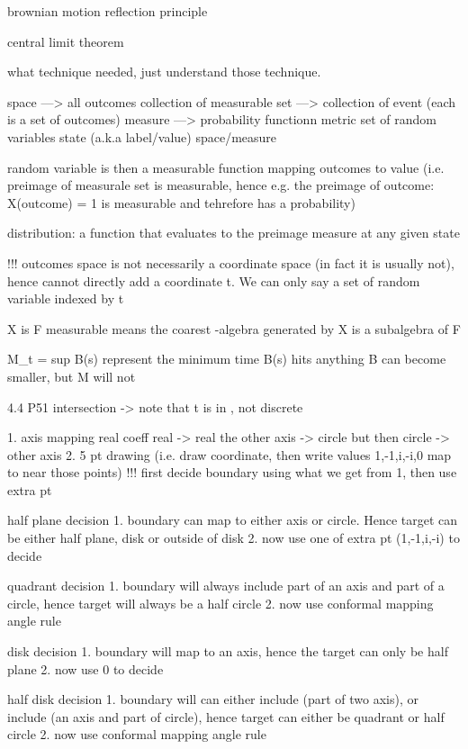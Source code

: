 brownian motion
reflection principle

central limit theorem

what technique needed, just understand those technique.

space  ---> all outcomes
collection of measurable set ---> collection of event (each is a set of outcomes)
measure ---> probability functionn
metric
set of random variables
state (a.k.a label/value) space/measure

random variable is then a measurable function mapping outcomes to value (i.e. preimage of measurale set is measurable, hence e.g. the preimage of {outcome: X(outcome) = 1} is measurable and tehrefore has a probability)

distribution: a function that evaluates to the preimage measure at any given state

!!! outcomes space is not necessarily a coordinate space (in fact it is usually not), hence cannot directly add a coordinate t. We can only say a set of random variable indexed by t


X is F measurable means the coarest \sigma-algebra generated by X is a subalgebra of F


M_t = sup B(s) represent the minimum time B(s) hits anything
B can become smaller, but M will not

4.4 P51 intersection -> note that t is in , not discrete

1. axis mapping
	real coeff real -> real
	the other axis -> circle
	but then circle -> other axis
2. 5 pt drawing (i.e. draw coordinate, then write values 1,-1,i,-i,0 map to near those points)	
	!!! first decide boundary using what we get from 1, then use extra pt
	
	half plane decision
		1. boundary can map to either axis or circle. Hence target can be either half plane, disk or outside of disk
		2. now use one of extra pt (1,-1,i,-i) to decide
		
	quadrant decision
		1. boundary will always include part of an axis and part of a circle, hence target will always be a half circle
		2. now use conformal mapping angle rule
	
	disk decision
		1. boundary will map to an axis, hence the target can only be half plane
		2. now use 0 to decide
		
	
	half disk decision
		1. boundary will can either include (part of two axis), or include (an axis and part of circle), hence target can either be quadrant or half circle
		2. now use conformal mapping angle rule
	
